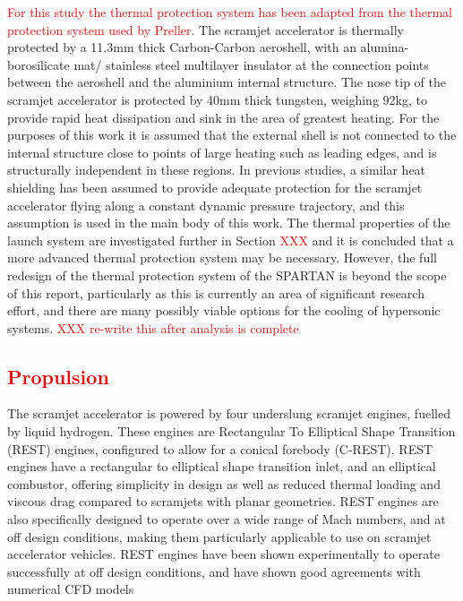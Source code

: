 \textcolor{red}{For this study the thermal protection system has been adapted from the thermal protection system used by Preller\cite{Preller2018a}}. The scramjet accelerator is thermally protected by a 11.3mm thick Carbon-Carbon aeroshell, with an alumina-borosilicate mat/ stainless steel multilayer insulator at the connection points between the aeroshell and the aluminium internal structure\cite{Preller2018a}. The nose tip of the scramjet accelerator is protected by 40mm thick tungsten, weighing 92kg, to provide rapid heat dissipation and sink in the area of greatest heating. For the purposes of this work it is assumed that the external shell is not connected to the internal structure close to points of large heating such as leading edges, and is structurally independent in these regions. 
In previous studies, a similar heat shielding has been assumed to provide adequate protection for the scramjet accelerator flying along a constant dynamic pressure trajectory\cite{Preller2018a}, and this assumption is used in the main body of this work. The thermal properties of the launch system are investigated further in Section \textcolor{red}{XXX} and it is concluded that a more advanced thermal protection system may be necessary. However, the full redesign of the thermal protection system of the SPARTAN is beyond the scope of this report, particularly as this is currently an area of significant research effort, and there are many possibly viable options for the cooling of hypersonic systems. 
\textcolor{red}{XXX re-write this after analysis is complete}

\textcolor{red}{
\subsection{Propulsion}\label{sec:propulsion}
}
The scramjet accelerator is powered by four underslung scramjet engines, fuelled by liquid hydrogen. These engines are Rectangular To Elliptical Shape Transition (REST) engines, configured to allow for a conical forebody (C-REST). REST engines have a rectangular to elliptical shape transition inlet, and an elliptical combustor, offering simplicity in design as well as reduced thermal loading and viscous drag compared to scramjets with planar geometries\cite{Suraweera2009}.  REST engines are also specifically designed to operate over a wide range of Mach numbers, and at off design conditions, making them particularly applicable to use on scramjet accelerator vehicles. REST engines have been shown experimentally to operate successfully at off design conditions\cite{Smart2006,Smart2009b}, and have shown good agreements with numerical CFD models\cite{Smart2009b}


